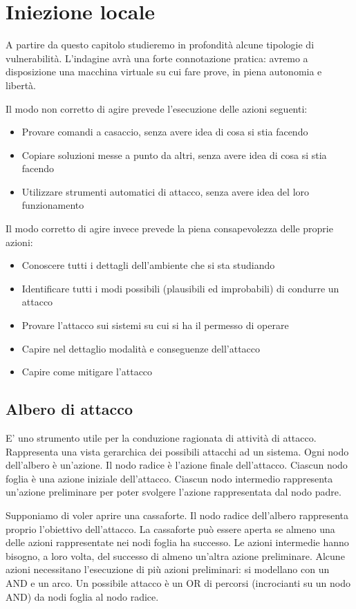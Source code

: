 \chapter{Iniezione locale}
A partire da questo capitolo studieremo in
profondità alcune tipologie di vulnerabilità. L'indagine avrà una forte connotazione pratica: avremo a disposizione una macchina virtuale su
cui fare prove, in piena autonomia e libertà.

Il modo non corretto di agire prevede
l'esecuzione delle azioni seguenti:
\begin{itemize}
    \item Provare comandi a casaccio, senza avere idea di
cosa si stia facendo
    \item Copiare soluzioni messe a punto da altri, senza
avere idea di cosa si stia facendo
    \item Utilizzare strumenti automatici di attacco, senza
avere idea del loro funzionamento 
\end{itemize}

Il modo corretto di agire invece prevede la
piena consapevolezza delle proprie azioni:
\begin{itemize}
    \item Conoscere tutti i dettagli dell'ambiente che si
sta studiando
    \item Identificare tutti i modi possibili (plausibili ed
improbabili) di condurre un attacco
    \item Provare l'attacco sui sistemi su cui si ha il
permesso di operare
    \item Capire nel dettaglio modalità e conseguenze
dell'attacco
    \item Capire come mitigare l'attacco 
\end{itemize}

\section{Albero di attacco}
E' uno strumento utile per la conduzione
ragionata di attività di attacco. Rappresenta una vista gerarchica dei possibili
attacchi ad un sistema. Ogni nodo dell'albero è un'azione. Il nodo radice è l'azione finale dell'attacco. Ciascun nodo foglia è una azione iniziale
dell'attacco. Ciascun nodo intermedio rappresenta un'azione
preliminare per poter svolgere l'azione
rappresentata dal nodo padre.

Supponiamo di voler aprire una cassaforte. Il nodo radice dell'albero rappresenta proprio
l'obiettivo dell'attacco. La cassaforte può essere aperta se almeno una
delle azioni rappresentate nei nodi foglia ha
successo. Le azioni intermedie hanno bisogno, a loro
volta, del successo di almeno un'altra azione
preliminare. Alcune azioni necessitano l'esecuzione di più
azioni preliminari: si modellano con un AND e un arco. Un possibile attacco è un OR di percorsi
(incrocianti su un nodo AND) da nodi foglia al
nodo radice.

